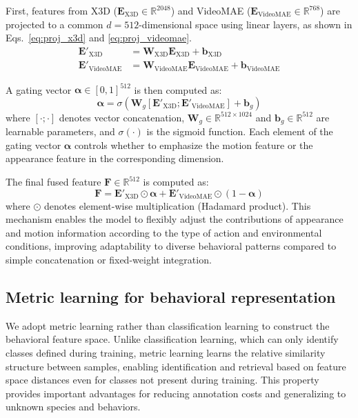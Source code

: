 \documentclass[twocolumn]{svjour3}
\begin{document}
First, features from X3D ($\mathbf{E}_{\mathrm{X3D}} \in \mathbb{R}^{2048}$) and VideoMAE ($\mathbf{E}_{\mathrm{VideoMAE}} \in \mathbb{R}^{768}$) are projected to a common $d=512$-dimensional space using linear layers, as shown in Eqs.~\eqref{eq:proj_x3d} and \eqref{eq:proj_videomae}.
\begin{align}
  \mathbf{E}'_{\mathrm{X3D}} &= \mathbf{W}_{\mathrm{X3D}} \mathbf{E}_{\mathrm{X3D}} + \mathbf{b}_{\mathrm{X3D}} \label{eq:proj_x3d} \\
  \mathbf{E}'_{\mathrm{VideoMAE}} &= \mathbf{W}_{\mathrm{VideoMAE}} \mathbf{E}_{\mathrm{VideoMAE}} + \mathbf{b}_{\mathrm{VideoMAE}} \label{eq:proj_videomae}
\end{align}

A gating vector $\boldsymbol{\alpha} \in [0,1]^{512}$ is then computed as:
\begin{equation}
  \boldsymbol{\alpha} = \sigma(\mathbf{W}_g[\mathbf{E}'_{\mathrm{X3D}}; \mathbf{E}'_{\mathrm{VideoMAE}}] + \mathbf{b}_g)
  \label{eq:gating}
\end{equation}
where $[\cdot;\cdot]$ denotes vector concatenation, $\mathbf{W}_g \in \mathbb{R}^{512 \times 1024}$ and $\mathbf{b}_g \in \mathbb{R}^{512}$ are learnable parameters, and $\sigma(\cdot)$ is the sigmoid function.
Each element of the gating vector $\boldsymbol{\alpha}$ controls whether to emphasize the motion feature or the appearance feature in the corresponding dimension.

The final fused feature $\mathbf{F} \in \mathbb{R}^{512}$ is computed as:
\begin{equation}
  \mathbf{F} = \mathbf{E}'_{\mathrm{X3D}} \odot \boldsymbol{\alpha} + \mathbf{E}'_{\mathrm{VideoMAE}} \odot (1 - \boldsymbol{\alpha})
  \label{eq:fusion}
\end{equation}
where $\odot$ denotes element-wise multiplication (Hadamard product).
This mechanism enables the model to flexibly adjust the contributions of appearance and motion information according to the type of action and environmental conditions, improving adaptability to diverse behavioral patterns compared to simple concatenation or fixed-weight integration.

\subsection{Metric learning for behavioral representation}

We adopt metric learning rather than classification learning to construct the behavioral feature space.
Unlike classification learning, which can only identify classes defined during training, metric learning learns the relative similarity structure between samples, enabling identification and retrieval based on feature space distances even for classes not present during training.
This property provides important advantages for reducing annotation costs and generalizing to unknown species and behaviors.
\end{document}

